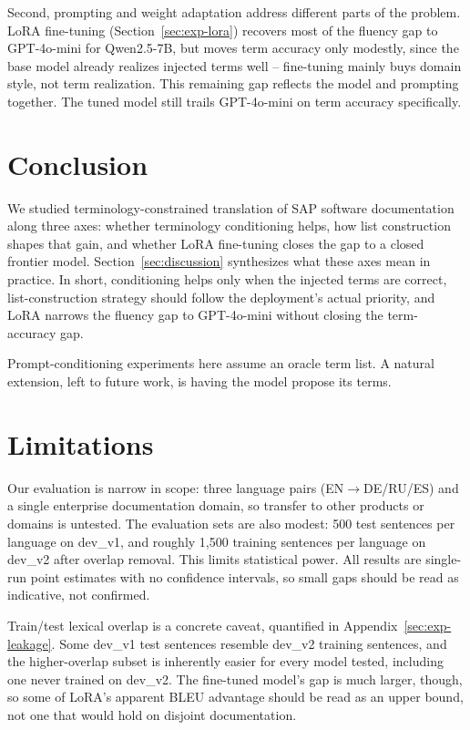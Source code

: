 \documentclass[11pt]{article}
\begin{document}
Second, prompting and weight adaptation address different parts of the problem. LoRA fine-tuning (Section~\ref{sec:exp-lora}) recovers most of the fluency gap to GPT-4o-mini for Qwen2.5-7B, but moves term accuracy only modestly, since the base model already realizes injected terms well -- fine-tuning mainly buys domain style, not term realization. This remaining gap reflects the model and prompting together. The tuned model still trails GPT-4o-mini on term accuracy specifically.

\section{Conclusion}
\label{sec:conclusion}

We studied terminology-constrained translation of SAP software documentation along three axes: whether terminology conditioning helps, how list construction shapes that gain, and whether LoRA fine-tuning closes the gap to a closed frontier model. Section~\ref{sec:discussion} synthesizes what these axes mean in practice. In short, conditioning helps only when the injected terms are correct, list-construction strategy should follow the deployment's actual priority, and LoRA narrows the fluency gap to GPT-4o-mini without closing the term-accuracy gap.

Prompt-conditioning experiments here assume an oracle term list. A natural extension, left to future work, is having the model propose its terms.

\section*{Limitations}

Our evaluation is narrow in scope: three language pairs (EN$\to$DE/RU/ES) and a single enterprise documentation domain, so transfer to other products or domains is untested. The evaluation sets are also modest: 500 test sentences per language on dev\_v1, and roughly 1{,}500 training sentences per language on dev\_v2 after overlap removal. This limits statistical power. All results are single-run point estimates with no confidence intervals, so small gaps should be read as indicative, not confirmed.

Train/test lexical overlap is a concrete caveat, quantified in Appendix~\ref{sec:exp-leakage}. Some dev\_v1 test sentences resemble dev\_v2 training sentences, and the higher-overlap subset is inherently easier for every model tested, including one never trained on dev\_v2. The fine-tuned model's gap is much larger, though, so some of LoRA's apparent BLEU advantage should be read as an upper bound, not one that would hold on disjoint documentation.
\end{document}

